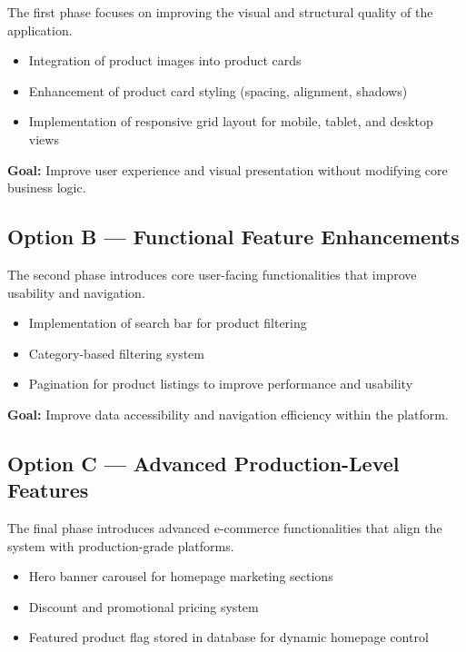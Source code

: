 \documentclass[12pt,a4paper]{article}
\begin{document}
The first phase focuses on improving the visual and structural quality of the application.

\begin{itemize}[noitemsep]
    \item Integration of product images into product cards
    \item Enhancement of product card styling (spacing, alignment, shadows)
    \item Implementation of responsive grid layout for mobile, tablet, and desktop views
\end{itemize}

\textbf{Goal:} Improve user experience and visual presentation without modifying core business logic.

\subsection{Option B — Functional Feature Enhancements}

The second phase introduces core user-facing functionalities that improve usability and navigation.

\begin{itemize}[noitemsep]
    \item Implementation of search bar for product filtering
    \item Category-based filtering system
    \item Pagination for product listings to improve performance and usability
\end{itemize}

\textbf{Goal:} Improve data accessibility and navigation efficiency within the platform.

\subsection{Option C — Advanced Production-Level Features}

The final phase introduces advanced e-commerce functionalities that align the system with production-grade platforms.

\begin{itemize}[noitemsep]
    \item Hero banner carousel for homepage marketing sections
    \item Discount and promotional pricing system
    \item Featured product flag stored in database for dynamic homepage control
\end{itemize}
\end{document}
